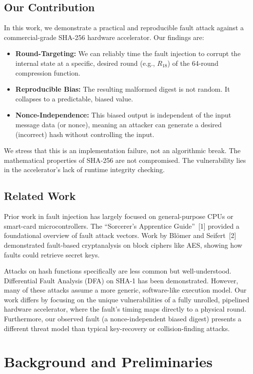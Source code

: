 \documentclass[11pt, a4paper]{article}
\begin{document}
\subsection*{Our Contribution}
In this work, we demonstrate a practical and reproducible fault attack against a commercial-grade SHA-256 hardware accelerator. Our findings are:
\begin{itemize}
    \item \textbf{Round-Targeting:} We can reliably time the fault injection to corrupt the internal state at a specific, desired round (e.g., $R_{18}$) of the 64-round compression function.
    \item \textbf{Reproducible Bias:} The resulting malformed digest is not random. It collapses to a predictable, biased value.
    \item \textbf{Nonce-Independence:} This biased output is independent of the input message data (or nonce), meaning an attacker can generate a desired (incorrect) hash without controlling the input.
\end{itemize}
We stress that this is an implementation failure, not an algorithmic break. The mathematical properties of SHA-256 are not compromised. The vulnerability lies in the accelerator's lack of runtime integrity checking.

\subsection*{Related Work}
Prior work in fault injection has largely focused on general-purpose CPUs or smart-card microcontrollers. The ``Sorcerer's Apprentice Guide''~[1] provided a foundational overview of fault attack vectors. Work by Bl\"omer and Seifert~[2] demonstrated fault-based cryptanalysis on block ciphers like AES, showing how faults could retrieve secret keys.

Attacks on hash functions specifically are less common but well-understood. Differential Fault Analysis (DFA) on SHA-1 has been demonstrated. However, many of these attacks assume a more generic, software-like execution model. Our work differs by focusing on the unique vulnerabilities of a fully unrolled, pipelined hardware accelerator, where the fault's timing maps directly to a physical round. Furthermore, our observed fault (a nonce-independent biased digest) presents a different threat model than typical key-recovery or collision-finding attacks.

\section{Background and Preliminaries}
\end{document}

